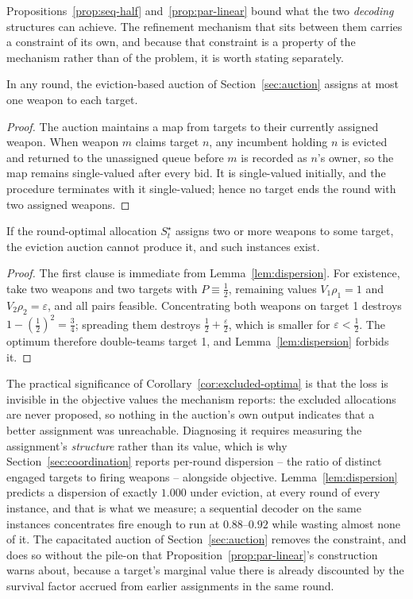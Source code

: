 Propositions~\ref{prop:seq-half} and~\ref{prop:par-linear} bound what the two \emph{decoding} structures can achieve. The refinement mechanism that sits between them carries a constraint of its own, and because that constraint is a property of the mechanism rather than of the problem, it is worth stating separately.

\begin{lemma}
\label{lem:dispersion}
In any round, the eviction-based auction of Section~\ref{sec:auction} assigns at most one weapon to each target.
\end{lemma}
\begin{proof}
The auction maintains a map from targets to their currently assigned weapon. When weapon $m$ claims target $n$, any incumbent holding $n$ is evicted and returned to the unassigned queue before $m$ is recorded as $n$'s owner, so the map remains single-valued after every bid. It is single-valued initially, and the procedure terminates with it single-valued; hence no target ends the round with two assigned weapons.
\end{proof}

\begin{corollary}
\label{cor:excluded-optima}
If the round-optimal allocation $S_t^\star$ assigns two or more weapons to some target, the eviction auction cannot produce it, and such instances exist.
\end{corollary}
\begin{proof}
The first clause is immediate from Lemma~\ref{lem:dispersion}. For existence, take two weapons and two targets with $P \equiv \tfrac12$, remaining values $V_1\rho_1 = 1$ and $V_2\rho_2 = \varepsilon$, and all pairs feasible. Concentrating both weapons on target 1 destroys $1 - (\tfrac12)^2 = \tfrac34$; spreading them destroys $\tfrac12 + \tfrac{\varepsilon}{2}$, which is smaller for $\varepsilon < \tfrac12$. The optimum therefore double-teams target 1, and Lemma~\ref{lem:dispersion} forbids it.
\end{proof}

The practical significance of Corollary~\ref{cor:excluded-optima} is that the loss is invisible in the objective values the mechanism reports: the excluded allocations are never proposed, so nothing in the auction's own output indicates that a better assignment was unreachable. Diagnosing it requires measuring the assignment's \emph{structure} rather than its value, which is why Section~\ref{sec:coordination} reports per-round dispersion -- the ratio of distinct engaged targets to firing weapons -- alongside objective. Lemma~\ref{lem:dispersion} predicts a dispersion of exactly $1.000$ under eviction, at every round of every instance, and that is what we measure; a sequential decoder on the same instances concentrates fire enough to run at $0.88$--$0.92$ while wasting almost none of it. The capacitated auction of Section~\ref{sec:auction} removes the constraint, and does so without the pile-on that Proposition~\ref{prop:par-linear}'s construction warns about, because a target's marginal value there is already discounted by the survival factor accrued from earlier assignments in the same round.

